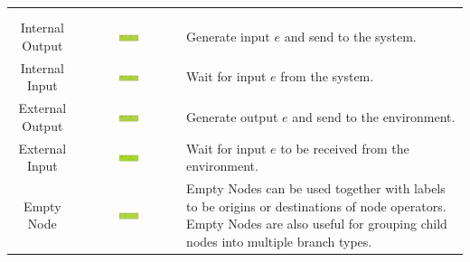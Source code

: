 \documentclass[]{article}
\begin{document}
\begin{landscape}
\begin{center}
\begin{small}
\begin{tabular}[c]{|c|c|p{12cm}|}
&&\\
&&\\
 \hline
\multirow{3}{*}{Internal Output} & \multirow{3}{*}{\includegraphics[width=0.23\textwidth]{figs/AppendixB/BasicNodes/IOEvent.pdf}}  & \multirow{3}{12cm}{Generate input $e$ and send to the system.} \\*
&&\\ 
&&\\
\hline
\multirow{3}{*}{Internal Input} & \multirow{3}{*}{\includegraphics[width=0.23\textwidth]{figs/AppendixB/BasicNodes/IIEvent.pdf}} & \multirow{3}{12cm}{Wait for input $e$ from the system.} \\*
&&\\
&&\\
\hline
\multirow{3}{*}{External Output} & \multirow{3}{*}{\includegraphics[width=0.23\textwidth]{figs/AppendixB/BasicNodes/EOEvent.pdf}} & \multirow{3}{12cm}{Generate output $e$ and send to the environment.} \\*
&&\\
&&\\
\hline
\multirow{3}{*}{External Input} & \multirow{3}{*}{\includegraphics[width=0.23\textwidth]{figs/AppendixB/BasicNodes/EIEvent.pdf}} & \multirow{3}{12cm}{Wait for input $e$ to be received from the environment.} \\*
&&\\
&&\\
\hline
\multirow{3}{*}{Empty Node}& \multirow{3}{*}{\includegraphics[width=0.23\textwidth]{figs/AppendixB/BasicNodes/Empty.pdf}} & \multirow{3}{12cm}{Empty Nodes can be used together with labels to be origins or destinations of node operators. Empty Nodes are also useful for grouping child nodes into multiple branch types.} \\*
&&\\
&&\\
\hline
\end{tabular}
\end{small}
\end{center}


\end{landscape}
\end{document}
